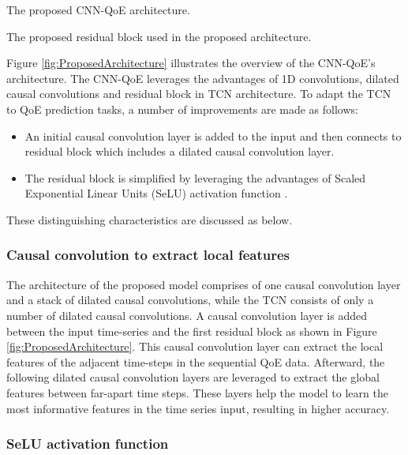    {The proposed CNN-QoE architecture.\label{fig:ProposedArchitecture}}
   
   {The proposed residual block used in the proposed architecture.\label{fig:ProposedResidualBlock}}
   
Figure \ref{fig:ProposedArchitecture} illustrates the overview of the CNN-QoE's architecture.
The CNN-QoE leverages the advantages of 1D convolutions, dilated causal convolutions and residual block in TCN architecture.
To adapt the TCN to QoE prediction tasks, a number of improvements are made as follows:

\begin{itemize}
  \item An initial causal convolution layer is added to the input and then connects to residual block which includes a dilated causal convolution layer.
  \item The residual block is simplified by leveraging the advantages of Scaled Exponential Linear Units (SeLU) activation function \cite{SeLU}.
\end{itemize}
These distinguishing characteristics are discussed as below.


\subsubsection{Causal convolution to extract local features}

The architecture of the proposed model comprises of one causal convolution layer and a stack of dilated causal convolutions, while the TCN consists of only a number of dilated causal convolutions.
A causal convolution layer is added between the input time-series and the first residual block as shown in Figure \ref{fig:ProposedArchitecture}.
This causal convolution layer can extract the local features of the adjacent time-steps in the sequential QoE data.
Afterward, the following dilated causal convolution layers are leveraged to extract the global features between far-apart time steps.
These layers help the model to learn the most informative features in the time series input, resulting in higher accuracy.


\subsubsection{SeLU activation function}

